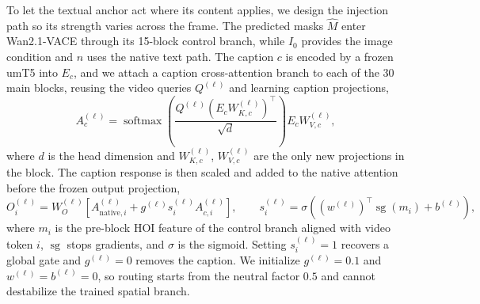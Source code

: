 \documentclass{article}
\begin{document}
To let the textual anchor act where its content applies, we design the injection
path so its strength varies across the frame. The predicted masks $\widehat{M}$
enter Wan2.1-VACE through its 15-block control branch, while $I_0$ provides the
image condition and $n$ uses the native text path. The caption $c$ is encoded by a
frozen umT5 into $E_c$, and we attach a caption cross-attention branch to each of
the 30 main blocks, reusing the video queries $Q^{(\ell)}$ and learning caption
projections,
\begin{equation}
A_c^{(\ell)} = \operatorname{softmax}\!\left(
\frac{Q^{(\ell)}\left(E_c W_{K,c}^{(\ell)}\right)^{\!\top}}{\sqrt{d}}\right)
E_c W_{V,c}^{(\ell)},
\label{eq:capattn}
\end{equation}
where $d$ is the head dimension and $W_{K,c}^{(\ell)}$, $W_{V,c}^{(\ell)}$ are
the only new projections in the block. The caption response is then scaled and
added to the native attention before the frozen output projection,
\begin{equation}
O_i^{(\ell)} = W_O^{(\ell)}\!\left[A_{\mathrm{native},i}^{(\ell)}
+ g^{(\ell)} s_i^{(\ell)} A_{c,i}^{(\ell)}\right],\qquad
s_i^{(\ell)} = \sigma\!\left(\left(w^{(\ell)}\right)^{\!\top}
\operatorname{sg}(m_i) + b^{(\ell)}\right),
\label{eq:route}
\end{equation}
where $m_i$ is the pre-block HOI feature of the control branch aligned with video
token $i$, $\operatorname{sg}$ stops gradients, and $\sigma$ is the sigmoid.
Setting $s_i^{(\ell)}\!=\!1$ recovers a global gate and $g^{(\ell)}\!=\!0$ removes
the caption. We initialize $g^{(\ell)}=0.1$ and $w^{(\ell)}=b^{(\ell)}=0$, so
routing starts from the neutral factor $0.5$ and cannot destabilize the trained
spatial branch.
\end{document}
